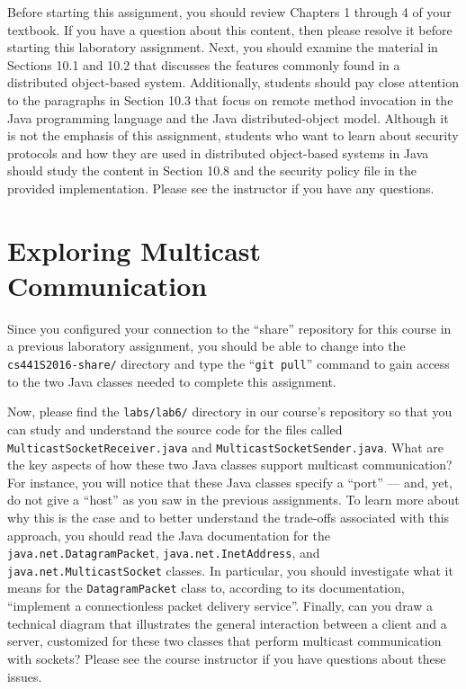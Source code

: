 Before starting this assignment, you should review Chapters 1 through 4 of your textbook. If you have a question about
this content, then please resolve it before starting this laboratory assignment. Next, you should examine the material
in Sections 10.1 and 10.2 that discusses the features commonly found in a distributed object-based system. Additionally,
students should pay close attention to the paragraphs in Section 10.3 that focus on remote method invocation in the Java
programming language and the Java distributed-object model. Although it is not the emphasis of this assignment, students
who want to learn about security protocols and how they are used in distributed object-based systems in Java should
study the content in Section 10.8 and the security policy file in the provided implementation.  Please see the
instructor if you have any questions.

\section*{Exploring Multicast Communication}

Since you configured your connection to the ``share'' repository for this course in a previous laboratory assignment,
you should be able to change into the {\tt cs441S2016-share/} directory and type the ``{\tt git pull}'' command to gain
access to the two Java classes needed to complete this assignment.

\begin{sloppypar}
  Now, please find the {\tt labs/lab6/} directory in our course's repository so that you can study and understand the
  source code for the files called {\tt MulticastSocketReceiver.java} and {\tt MulticastSocketSender.java}. What are the
  key aspects of how these two Java classes support multicast communication? For instance, you will notice that these
  Java classes specify a ``port'' --- and, yet, do not give a ``host'' as you saw in the previous assignments. To learn more
  about why this is the case and to better understand the trade-offs associated with this approach, you should read the
  Java documentation for the {\tt java.net.DatagramPacket}, {\tt java.net.InetAddress}, and {\tt
  java.net.MulticastSocket} classes. In particular, you should investigate what it means for the {\tt DatagramPacket}
  class to, according to its documentation, ``implement a connectionless packet delivery service''.  Finally, can you
  draw a technical diagram that illustrates the general interaction between a client and a server, customized for these
  two classes that perform multicast communication with sockets? Please see the course instructor if you have
  questions about these issues.
\end{sloppypar}

